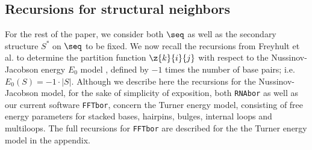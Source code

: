 \subsection*{Recursions for structural neighbors}

For the rest of the paper, we consider both $\seq$ as well as the
secondary structure $S^*$ on $\seq$ to be fixed. We now recall the
recursions from Freyhult et al. \cite{Freyhult.ab05} to determine
the partition function $\z{k}{i}{j}$ with
respect to the Nussinov-Jacobson
energy $E_0$ model \cite{nussinovJacobson}, defined by
$-1$ times the number of base pairs; i.e. $E_0(S) = -1 \cdot |S|$.
Although we describe here the recursions for the Nussinov-Jacobson
model, for the sake of
simplicity of exposition, both {\tt RNAbor}
\cite{Freyhult.ab05} as well as our current software {\tt FFTbor},
concern the Turner energy model, consisting of free energy parameters for
stacked bases, hairpins, bulges, internal loops and multiloops. The full
recursions for {\tt FFTbor} are described for the
the Turner energy model in the appendix.

